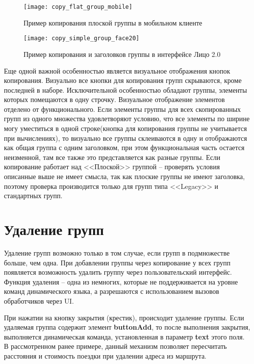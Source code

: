 \documentclass[../index.tex]{subfiles}
\begin{document}
\begin{figure}[h]
    \texttt{[image: copy\_flat\_group\_mobile]}
    \centering
    \caption{Пример копирования плоской группы в мобильном клиенте}
\end{figure}

\begin{figure}[h]
    \texttt{[image: copy\_simple\_group\_face20]}
    \centering
    \caption{Пример копирования и заголовков группы в интерфейсе Лицо 2.0}
\end{figure}

Еще одной важной особенностью является визуальное отображения кнопок копирования. Визуально все кнопки для копирования групп скрываются, кроме последней в наборе.
Исключительной особенностью обладают группы, элементы которых помещаются в одну строчку. Визуальное отображение элементов отделено от функционального. Если элементы группы для всех скопированных групп из одного множества удовлетворяют условию, что все элементы по ширине могу уместиться в одной строке(кнопка для копирования группы не учитывается при вычислениях), то визуально все группы склеиваются в одну и отображаются как общая группа с одним заголовком, при этом функциональная часть остается неизменной, там все также это представляется как разные группы.
Если копирование работает над <<Плоской>> группой -- проверять условия описанные выше не имеет смысла, так как плоские группы не имеют заголовка, поэтому проверка производится только для групп типа <<Legacy>> и стандартных групп.

\section{Удаление групп}

Удаление групп возможно только в том случае, если групп в подмножестве больше, чем одна. При добавлении группы через копирование у всех групп появляется возможность удалить группу через пользовательский интерфейс. Функция удаления -- одна из немногих, которые не поддерживается на уровне команд динамического языка, а разрешаются с использованием вызовов обработчиков через UI.

При нажатии на кнопку закрытия (крестик), происходит удаление группы. Если удаляемая группа содержит элемент \textbf{buttonAdd}, то после выполнения закрытия, выполняется динамическая команда, установленная в параметр \textbf{text} этого поля. В рассмотренном ранее примере, данный механизм позволяет пересчитать расстояния и стоимость поездки при удалении адреса из маршрута.
\end{document}
